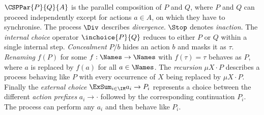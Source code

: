 \documentclass[]{eptcs}
\begin{document}
$\CSPPar{P}{Q}{A}$ is the parallel composition of $ P $ and $ Q $, where $ P $ and $ Q $ can proceed independently except for actions $ a \in A $, on which they have to synchronise.
The process $\Div$ describes \emph{divergence}.
$\Stop$ denotes \emph{inaction}.
The \emph{internal choice} operator $\inchoice{P}{Q}$ reduces to either $ P $ or $ Q $ within a single internal step.
\emph{Concealment} $P/b$ hides an action $ b $ and masks it as $ \tau $.
\emph{Renaming} $f(P)$ for some $f:\Names \to \Names$ with $f(\tau)=\tau$ behaves as $ P $, where $ a $ is replaced by $ f(a) $ for all $ a \in \Names $.
The \emph{recursion} $\mu X \cdot P$ describes a process behaving like $P$ with every occurrence of $X$ being replaced by $\mu X \cdot P$.
Finally the \emph{external choice} $\ExSum_{i \in \IM} a_i \rightarrow P_i$ represents a choice between the different \emph{action prefixes} $a_i \rightarrow \cdot $ followed by the corresponding continuation $P_i$. The process can perform any $ a_i $ and then behave like $P_i$.
 
\end{document}
